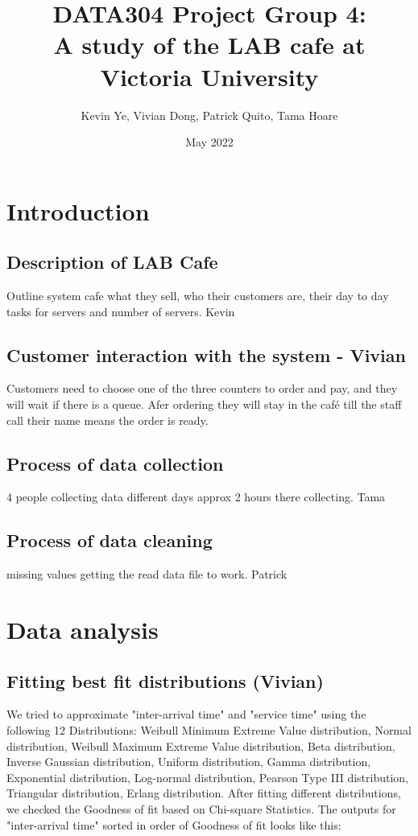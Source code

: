 \documentclass{article}
\title{\Huge DATA304 Project Group 4:\\
  \Huge A study of the LAB cafe at Victoria University}
\author{\Large Kevin Ye, Vivian Dong, Patrick Quito, Tama Hoare }
\date{\Large May 2022}
\begin{document}
\maketitle
\newpage

\section{Introduction}

\subsection{Description of LAB Cafe}
Outline system cafe what they sell, who their customers are, their day to day tasks for servers and number of servers. Kevin

\subsection{Customer interaction with the system - Vivian}
Customers need to choose one of the three counters to order and pay, and they will wait if there is a queue. Afer ordering they will stay in the café till the staff call their name means the order is ready.

\subsection{Process of data collection}
4 people collecting data
different days
approx 2 hours there collecting. Tama

\subsection{Process of data cleaning}
missing values 
getting the read data file to work. Patrick


\section{Data analysis}

\subsection{Fitting best fit distributions (Vivian)}

We tried to approximate "inter-arrival time" and "service time" using the following 12 Distributions: Weibull Minimum Extreme Value distribution, Normal distribution, Weibull Maximum Extreme Value distribution, Beta distribution, Inverse Gaussian distribution, Uniform distribution, Gamma distribution, Exponential distribution, Log-normal distribution, Pearson Type III distribution, Triangular distribution, Erlang distribution. After fitting different distributions, we checked the Goodness of fit based on Chi-square Statistics. The outputs for "inter-arrival time" sorted in order of Goodness of fit looks like this: 
\end{document}
